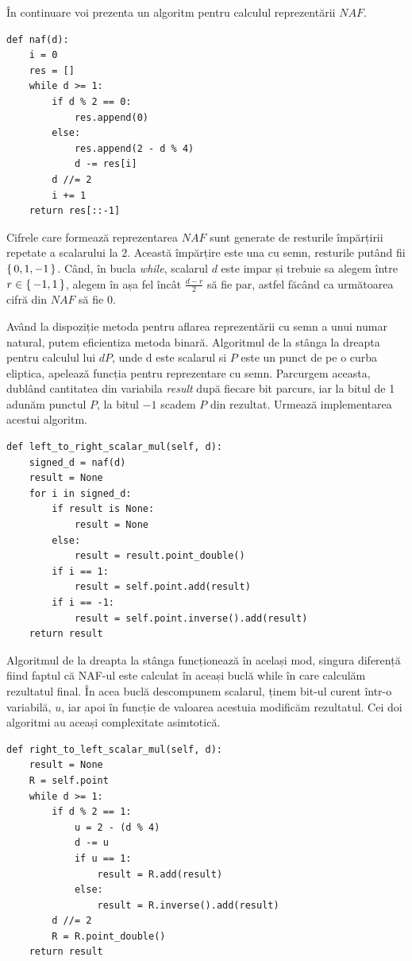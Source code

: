 În continuare voi prezenta un algoritm pentru calculul reprezentării $NAF$. \\

\begin{lstlisting}
def naf(d):
    i = 0
    res = []
    while d >= 1:
        if d % 2 == 0:
            res.append(0)
        else:
            res.append(2 - d % 4)
            d -= res[i]
        d //= 2
        i += 1
    return res[::-1]
\end{lstlisting}

Cifrele care formează reprezentarea  $NAF$ sunt generate de resturile împărțirii repetate a scalarului la $2$. Această împărțire este una cu semn, resturile putând fii $\set{0, 1, -1}$. Când, în bucla \textit{while}, scalarul $d$ este impar și trebuie sa alegem între $r\in\set{-1, 1}$, alegem în așa fel încât $\frac{d-r}{2}$ să fie par, astfel făcând ca următoarea cifră din $NAF$ să fie $0$.

Având la dispoziție metoda pentru aflarea reprezentării cu semn a unui numar natural, putem eficientiza metoda binară. Algoritmul de la stânga la dreapta pentru calculul lui $dP$, unde d este scalarul si $P$ este un punct de pe o curba eliptica, apelează funcția pentru reprezentare cu semn. Parcurgem aceasta, dublând cantitatea din variabila \textit{result} după fiecare bit parcurs, iar la bitul de 1 adunăm punctul $P$, la bitul $-1$ scadem $P$ din rezultat. Urmează implementarea acestui algoritm.

\begin{lstlisting}
def left_to_right_scalar_mul(self, d):
    signed_d = naf(d)
    result = None
    for i in signed_d:
        if result is None:
            result = None
        else:
            result = result.point_double()
        if i == 1:
            result = self.point.add(result)
        if i == -1:
            result = self.point.inverse().add(result)
    return result
\end{lstlisting}

Algoritmul de la dreapta la stânga funcționează în același mod, singura diferență fiind faptul că NAF-ul este calculat în aceași buclă while în care calculăm rezultatul final. În acea buclă descompunem scalarul, ținem bit-ul curent într-o variabilă, $u$, iar apoi în funcție de valoarea acestuia modificăm rezultatul. Cei doi algoritmi au aceași complexitate asimtotică.

\begin{lstlisting}
def right_to_left_scalar_mul(self, d):
    result = None
    R = self.point
    while d >= 1:
        if d % 2 == 1:
            u = 2 - (d % 4)
            d -= u
            if u == 1:
                result = R.add(result)
            else:
                result = R.inverse().add(result)
        d //= 2
        R = R.point_double()
    return result
\end{lstlisting}

